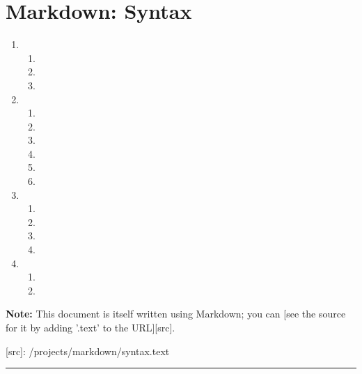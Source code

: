 \chapter{Markdown: Syntax}

\begin{enumerate}
  \item{
    \begin{enumerate}
      \item{}
      \item{}
      \item{}
    \end{enumerate}
  }
  \item{
    \begin{enumerate}
      \item{}
      \item{}
      \item{}
      \item{}
      \item{}
      \item{}
    \end{enumerate}
  }
  \item{
    \begin{enumerate}
      \item{}
      \item{}
      \item{}
      \item{}
    \end{enumerate}
  }
  \item{
    \begin{enumerate}
      \item{}
      \item{}
    \end{enumerate}
  }
\end{enumerate}

\textbf{Note:} This document is itself written using Markdown; you
can [see the source for it by adding '.text' to the URL][src].

  [src]: /projects/markdown/syntax.text

\rule{0.5\textwidth}{.4pt}

